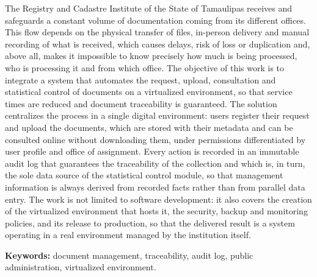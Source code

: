 The Registry and Cadastre Institute of the State of Tamaulipas receives and safeguards a constant volume of documentation coming from its different offices. This flow depends on the physical transfer of files, in-person delivery and manual recording of what is received, which causes delays, risk of loss or duplication and, above all, makes it impossible to know precisely how much is being processed, who is processing it and from which office. The objective of this work is to integrate a system that automates the request, upload, consultation and statistical control of documents on a virtualized environment, so that service times are reduced and document traceability is guaranteed. The solution centralizes the process in a single digital environment: users register their request and upload the documents, which are stored with their metadata and can be consulted online without downloading them, under permissions differentiated by user profile and office of assignment. Every action is recorded in an immutable audit log that guarantees the traceability of the collection and which is, in turn, the sole data source of the statistical control module, so that management information is always derived from recorded facts rather than from parallel data entry. The work is not limited to software development: it also covers the creation of the virtualized environment that hosts it, the security, backup and monitoring policies, and its release to production, so that the delivered result is a system operating in a real environment managed by the institution itself.

\textbf{Keywords:} document management, traceability, audit log, public administration, virtualized environment.


